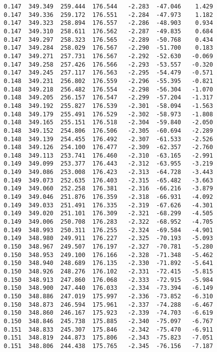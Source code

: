 \begin{verbatim}
   0.147  349.349  259.444  176.544   -2.283  -47.046    1.429
   0.147  349.336  259.172  176.551   -2.284  -47.973    1.182
   0.147  349.323  258.894  176.557   -2.286  -48.903    0.934
   0.147  349.310  258.611  176.562   -2.287  -49.835    0.684
   0.147  349.297  258.323  176.565   -2.289  -50.768    0.434
   0.147  349.284  258.029  176.567   -2.290  -51.700    0.183
   0.147  349.271  257.731  176.567   -2.292  -52.630   -0.069
   0.147  349.258  257.426  176.566   -2.293  -53.557   -0.320
   0.147  349.245  257.117  176.563   -2.295  -54.479   -0.571
   0.148  349.231  256.802  176.559   -2.296  -55.395   -0.821
   0.148  349.218  256.482  176.554   -2.298  -56.304   -1.070
   0.148  349.205  256.157  176.547   -2.299  -57.204   -1.317
   0.148  349.192  255.827  176.539   -2.301  -58.094   -1.563
   0.148  349.179  255.491  176.529   -2.302  -58.973   -1.808
   0.148  349.165  255.151  176.518   -2.304  -59.840   -2.050
   0.148  349.152  254.806  176.506   -2.305  -60.694   -2.289
   0.148  349.139  254.455  176.492   -2.307  -61.533   -2.526
   0.148  349.126  254.100  176.477   -2.309  -62.357   -2.760
   0.148  349.113  253.741  176.460   -2.310  -63.165   -2.991
   0.149  349.099  253.377  176.443   -2.312  -63.955   -3.219
   0.149  349.086  253.008  176.423   -2.313  -64.728   -3.443
   0.149  349.073  252.635  176.403   -2.315  -65.482   -3.663
   0.149  349.060  252.258  176.381   -2.316  -66.216   -3.879
   0.149  349.046  251.876  176.359   -2.318  -66.931   -4.092
   0.149  349.033  251.491  176.335   -2.319  -67.626   -4.301
   0.149  349.020  251.101  176.309   -2.321  -68.299   -4.505
   0.149  349.006  250.708  176.283   -2.322  -68.952   -4.705
   0.149  348.993  250.311  176.255   -2.324  -69.584   -4.901
   0.149  348.980  249.911  176.227   -2.325  -70.193   -5.093
   0.150  348.967  249.507  176.197   -2.327  -70.781   -5.280
   0.150  348.953  249.100  176.166   -2.328  -71.348   -5.462
   0.150  348.940  248.689  176.135   -2.330  -71.892   -5.641
   0.150  348.926  248.276  176.102   -2.331  -72.415   -5.815
   0.150  348.913  247.860  176.068   -2.333  -72.915   -5.984
   0.150  348.900  247.440  176.033   -2.334  -73.394   -6.149
   0.150  348.886  247.019  175.997   -2.336  -73.852   -6.310
   0.150  348.873  246.594  175.961   -2.337  -74.288   -6.467
   0.150  348.860  246.167  175.923   -2.339  -74.703   -6.619
   0.150  348.846  245.738  175.885   -2.340  -75.097   -6.767
   0.151  348.833  245.307  175.846   -2.342  -75.470   -6.911
   0.151  348.819  244.873  175.806   -2.343  -75.823   -7.051
   0.151  348.806  244.438  175.765   -2.345  -76.156   -7.187

\end{verbatim}
